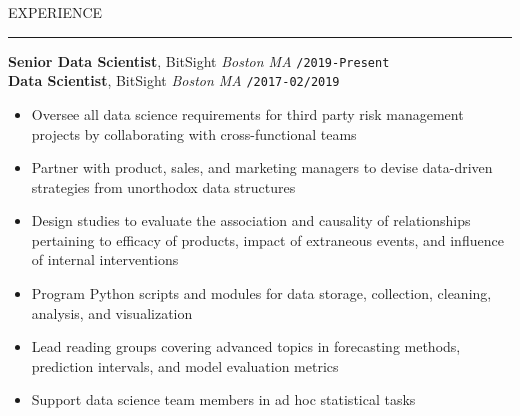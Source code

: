 \documentclass[10pt,english]{report}
\begin{document}
\vspace{5mm}

{\centering\large{EXPERIENCE}\par}
\vspace{1mm}\hrule
\vspace{1mm}

\textbf{Senior Data Scientist}, BitSight \hfill \textit{Boston MA} \texttt{/2019-Present} \\
\textbf{Data Scientist}, BitSight \hfill \textit{Boston MA} \texttt{/2017-02/2019}
\begin{itemize}
\item Oversee all data science requirements for third party risk management projects by collaborating with cross-functional teams
\item Partner with product, sales, and marketing managers to devise data-driven strategies from unorthodox data structures
\item Design studies to evaluate the association and causality of relationships pertaining to efficacy of products, impact of extraneous events, and influence of internal interventions
\item Program Python scripts and modules for data storage, collection, cleaning, analysis, and visualization
\item Lead reading groups covering advanced topics in forecasting methods, prediction intervals, and model evaluation metrics
\item Support data science team members in ad hoc statistical tasks
\end{itemize}

\vspace{1mm}
\end{document}
